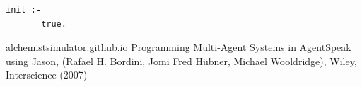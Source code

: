 \documentclass[12pt,a4paper,openright,twoside]{report}
\begin{document}
\medskip
\begin{lstlisting}[firstnumber=1,label={lst:Blackboard},caption={Teoria per gli spazi di tuple}]
   init :-
       true.
\end{lstlisting}


\begin{thebibliography}{90} %
\rhead[\fancyplain{}{\bfseries \leftmark}]{\fancyplain{}{\bfseries \thepage}}

 alchemistsimulator.github.io
 Programming Multi-Agent Systems in AgentSpeak using Jason, (Rafael H. Bordini, Jomi Fred H\"{u}bner, Michael Wooldridge), Wiley, Interscience (2007)

\end{thebibliography}
\end{document}
